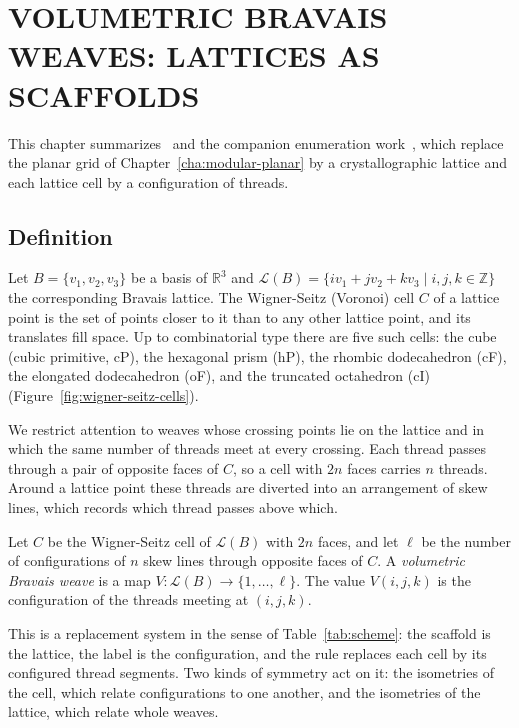 %
%

\chapter{\uppercase{Volumetric Bravais Weaves: Lattices as Scaffolds}}
\label{cha:volumetric-bravais}

This chapter summarizes~\cite{yildiz2025volumetric} and the companion enumeration work~\cite{akpanya2025enumeration}, which replace the planar grid of Chapter~\ref{cha:modular-planar} by a crystallographic lattice and each lattice cell by a configuration of threads.

\section{Definition}
\label{sec:bravais}

Let $B=\{v_1,v_2,v_3\}$ be a basis of $\mathbb{R}^3$ and $\mathcal{L}(B)=\{iv_1+jv_2+kv_3 \mid i,j,k\in\mathbb{Z}\}$ the corresponding Bravais lattice. The Wigner-Seitz (Voronoi) cell $C$ of a lattice point is the set of points closer to it than to any other lattice point, and its translates fill space. Up to combinatorial type there are five such cells: the cube (cubic primitive, cP), the hexagonal prism (hP), the rhombic dodecahedron (cF), the elongated dodecahedron (oF), and the truncated octahedron (cI) (Figure~\ref{fig:wigner-seitz-cells}).

We restrict attention to weaves whose crossing points lie on the lattice and in which the same number of threads meet at every crossing. Each thread passes through a pair of opposite faces of $C$, so a cell with $2n$ faces carries $n$ threads. Around a lattice point these threads are diverted into an arrangement of skew lines, which records which thread passes above which.

\begin{definition}
Let $C$ be the Wigner-Seitz cell of $\mathcal{L}(B)$ with $2n$ faces, and let $\ell$ be the number of configurations of $n$ skew lines through opposite faces of $C$. A \emph{volumetric Bravais weave} is a map $V:\mathcal{L}(B)\to\{1,\ldots,\ell\}$. The value $V(i,j,k)$ is the configuration of the threads meeting at $(i,j,k)$.
\end{definition}

This is a replacement system in the sense of Table~\ref{tab:scheme}: the scaffold is the lattice, the label is the configuration, and the rule replaces each cell by its configured thread segments. Two kinds of symmetry act on it: the isometries of the cell, which relate configurations to one another, and the isometries of the lattice, which relate whole weaves.

